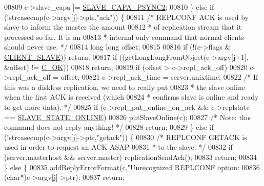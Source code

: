 \begin{DoxyCode}
{{{{{{{{{{{{{{{{{{{{{{{{{{{{{{{00809                 c->slave\_capa |= \hyperlink{server_8h_a7ae8ce840619af1c0922648a45816afe}{SLAVE\_CAPA\_PSYNC2};
00810         \} \textcolor{keywordflow}{else} \textcolor{keywordflow}{if} (!strcasecmp(c->argv[j]->ptr,\textcolor{stringliteral}{"ack"})) \{
00811             \textcolor{comment}{/* REPLCONF ACK is used by slave to inform the master the amount}
00812 \textcolor{comment}{             * of replication stream that it processed so far. It is an}
00813 \textcolor{comment}{             * internal only command that normal clients should never use. */}
00814             \textcolor{keywordtype}{long} \textcolor{keywordtype}{long} offset;
00815 
00816             \textcolor{keywordflow}{if} (!(c->flags & \hyperlink{server_8h_ae9f6995948253652bc9454d79a72f4a7}{CLIENT\_SLAVE})) \textcolor{keywordflow}{return};
00817             \textcolor{keywordflow}{if} ((getLongLongFromObject(c->argv[j+1], &offset) != \hyperlink{server_8h_a303769ef1065076e68731584e758d3e1}{C\_OK}))
00818                 \textcolor{keywordflow}{return};
00819             \textcolor{keywordflow}{if} (offset > c->repl\_ack\_off)
00820                 c->repl\_ack\_off = offset;
00821             c->repl\_ack\_time = server.unixtime;
00822             \textcolor{comment}{/* If this was a diskless replication, we need to really put}
00823 \textcolor{comment}{             * the slave online when the first ACK is received (which}
00824 \textcolor{comment}{             * confirms slave is online and ready to get more data). */}
00825             \textcolor{keywordflow}{if} (c->repl\_put\_online\_on\_ack && c->replstate == 
      \hyperlink{server_8h_ad895fdf16e5ed5275d19ddf8578b900f}{SLAVE\_STATE\_ONLINE})
00826                 putSlaveOnline(c);
00827             \textcolor{comment}{/* Note: this command does not reply anything! */}
00828             \textcolor{keywordflow}{return};
00829         \} \textcolor{keywordflow}{else} \textcolor{keywordflow}{if} (!strcasecmp(c->argv[j]->ptr,\textcolor{stringliteral}{"getack"})) \{
00830             \textcolor{comment}{/* REPLCONF GETACK is used in order to request an ACK ASAP}
00831 \textcolor{comment}{             * to the slave. */}
00832             \textcolor{keywordflow}{if} (server.masterhost && server.master) replicationSendAck();
00833             \textcolor{keywordflow}{return};
00834         \} \textcolor{keywordflow}{else} \{
00835             addReplyErrorFormat(c,\textcolor{stringliteral}{"Unrecognized REPLCONF option: %
00836                 (\textcolor{keywordtype}{char}*)c->argv[j]->ptr);
00837             \textcolor{keywordflow}{return};
}}}}}}}}}}}}}}}}}}}}}}}}}}}}}}}}
\end{DoxyCode}
